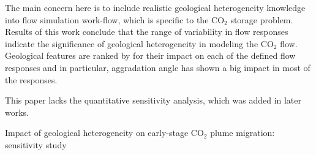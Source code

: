{The main concern here is to include realistic geological heterogeneity knowledge
into flow simulation work-flow, which is specific to the $\mbox{CO}_2$ storage
problem. Results of this work conclude that the range of variability in flow
responses indicate the significance of geological heterogeneity in modeling the
$\mbox{CO}_2$ flow. Geological features are ranked by for their impact on each
of the defined flow responses and in particular, aggradation angle has shown a
big impact in most of the responses.

This paper lacks the quantitative sensitivity analysis, which was added in later works. 

}%


%
%
{Impact of geological heterogeneity on early-stage $\mbox{CO}_2$ plume
migration: sensitivity study}
